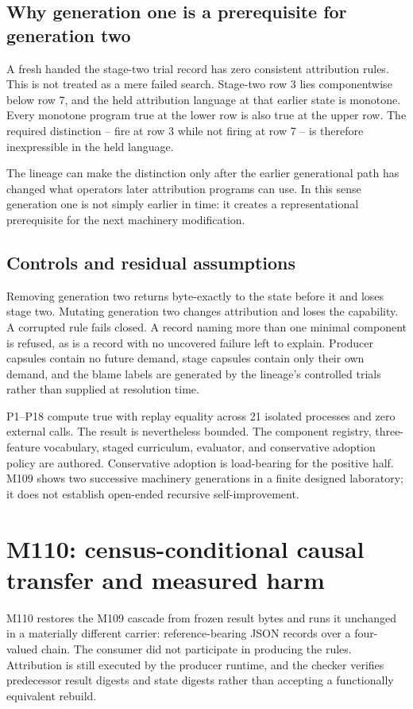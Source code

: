 \subsection{Why generation one is a prerequisite for generation two}
A fresh \mzero handed the stage-two trial record has zero consistent attribution rules. This is not treated as a mere failed search. Stage-two row 3 lies componentwise below row 7, and the held attribution language at that earlier state is monotone. Every monotone program true at the lower row is also true at the upper row. The required distinction -- fire at row 3 while not firing at row 7 -- is therefore inexpressible in the held language.

The lineage can make the distinction only after the earlier generational path has changed what operators later attribution programs can use. In this sense generation one is not simply earlier in time: it creates a representational prerequisite for the next machinery modification.

\subsection{Controls and residual assumptions}
Removing generation two returns byte-exactly to the state before it and loses stage two. Mutating generation two changes attribution and loses the capability. A corrupted rule fails closed. A record naming more than one minimal component is refused, as is a record with no uncovered failure left to explain. Producer capsules contain no future demand, stage capsules contain only their own demand, and the blame labels are generated by the lineage's controlled trials rather than supplied at resolution time.

P1--P18 compute true with replay equality across 21 isolated processes and zero external calls. The result is nevertheless bounded. The component registry, three-feature vocabulary, staged curriculum, evaluator, and conservative adoption policy are authored. Conservative adoption is load-bearing for the positive half. M109 shows two successive machinery generations in a finite designed laboratory; it does not establish open-ended recursive self-improvement.

\section{M110: census-conditional causal transfer and measured harm}
\label{sec:m110}
M110 restores the M109 cascade from frozen result bytes and runs it unchanged in a materially different carrier: reference-bearing JSON records over a four-valued chain. The consumer did not participate in producing the rules. Attribution is still executed by the producer runtime, and the checker verifies predecessor result digests and state digests rather than accepting a functionally equivalent rebuild.

